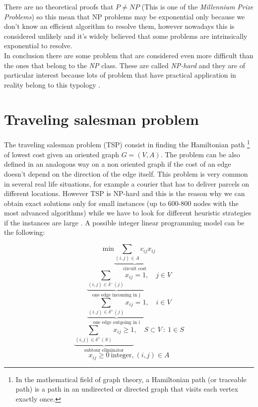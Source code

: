 There are no theoretical proofs that $P \neq NP$ (This is one of the \textit{Millennium Prize Problems}) so this mean that NP problems may be exponential only because we don't know an efficient algorithm to resolve them, however nowadays this is considered unlikely and it's widely believed that some problems are intrinsically exponential to resolve.\\
In conclusion there are some problem that are considered even more difficult than the ones that belong to the \textit{NP} class. These are called \textit{NP-hard} and they are of particular interest because lots of problem that have practical application in reality belong to this typology \cite{automi}. 

\section{Traveling salesman problem}
\label{TSPdef}
The traveling salesman problem (TSP) consist in finding the Hamiltonian path \footnote{In the mathematical field of graph theory, a Hamiltonian path (or traceable path) is a path in an undirected or directed graph that visits each vertex exactly once.} of lowest cost given an oriented graph $G=(V, A)$. The problem can be also defined in an analogous way on a non oriented graph if the cost of an edge doesn't depend  on the direction of the edge itself. This problem is very common in several real life situations, for example a courier that has to deliver parcels on different locations. However TSP is NP-hard and this is the reason why we can obtain exact solutions only for small instances (up to 600-800 nodes with the most advanced algorithms) while we have to look for different heuristic strategies if the instances are large \cite{ro}.
A possible integer linear programming model can be the following:

\begin{equation}
	\text{min} \underbrace{\sum_{(i,j) \in A} c_{ij}x_{ij}}_\text{circuit cost}
\end{equation}
\begin{equation}
	\underbrace{\sum_{(i,j) \in \delta^{-}(j)} x_{ij} = 1}_\text{one edge incoming in j}, \quad j \in V 
\end{equation}
\begin{equation}
	\underbrace{\sum_{(i,j) \in \delta^{+}(j)} x_{ij} = 1}_\text{one edge outgoing in i}, \quad i \in V
\end{equation}
\begin{equation}
	\underbrace{\sum_{(i,j) \in \delta^{+}(S)} x_{ij} \geq 1}_\text{subtour eliminator}, \quad S \subset V \ : \ 1 \in S
\end{equation}
\begin{equation}
	x_{ij} \geq 0 \ \text{integer,} \ (i,j) \in A 
\end{equation}

